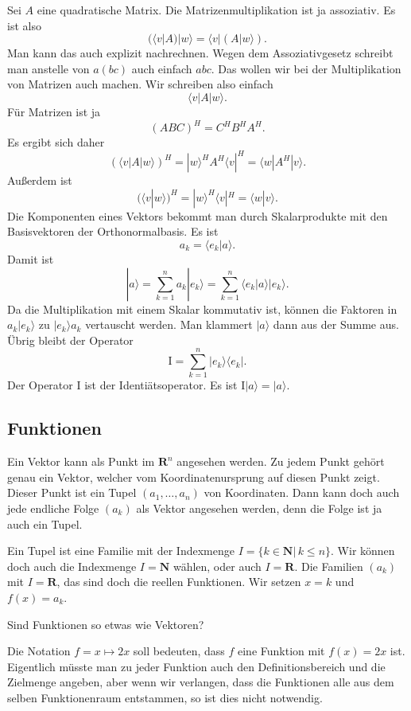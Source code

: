 \documentclass[a4paper,10pt,fleqn,twocolumn,twoside]{article}
\begin{document}
Sei \(A\) eine quadratische Matrix. Die Matrizenmultiplikation ist
ja assoziativ. Es ist also
\[(\langle v|A)|w\rangle = \langle v|(A|w\rangle).\]
Man kann das auch explizit nachrechnen. Wegen dem Assoziativgesetz
schreibt man anstelle von \(a(bc)\) auch einfach \(abc\). Das wollen
wir bei der Multiplikation von Matrizen auch machen. Wir schreiben also einfach
\[\langle v|A|w\rangle.\]
Für Matrizen ist ja
\[(ABC)^H = C^HB^HA^H.\]
Es ergibt sich daher
\[(\langle v|A|w\rangle)^H = |w\rangle^H A^H \langle v|^H
= \langle w|A^H|v\rangle.\]
Außerdem ist
\[(\langle v|w\rangle)^H = |w\rangle^H\langle v|^H
= \langle w|v\rangle.\]
Die Komponenten eines Vektors bekommt man durch Skalarprodukte mit
den Basisvektoren der Orthonormalbasis. Es ist
\[a_k = \langle e_k|a\rangle.\]
Damit ist
\[|a\rangle = \sum_{k=1}^n a_k |e_k\rangle
= \sum_{k=1}^n \langle e_k|a\rangle |e_k\rangle.\]
Da die Multiplikation mit einem Skalar kommutativ ist, können die
Faktoren in \(a_k|e_k\rangle\) zu \(|e_k\rangle a_k\) vertauscht
werden. Man klammert \(|a\rangle\) dann aus der Summe aus.
Übrig bleibt der Operator
\[\mathrm I = \sum_{k=1}^n |e_k\rangle\langle e_k|.\]
Der Operator \(\mathrm I\) ist der Identiätsoperator.
Es ist \(\mathrm I|a\rangle = |a\rangle\).


\subsection{Funktionen}

Ein Vektor kann als Punkt im \(\mathbf R^n\) angesehen werden.
Zu jedem Punkt gehört genau ein Vektor, welcher vom
Koordinatenursprung auf diesen Punkt zeigt. Dieser Punkt ist
ein Tupel \((a_1,\ldots,a_n)\) von Koordinaten. Dann kann doch auch
jede endliche Folge \((a_k)\) als Vektor angesehen werden, denn die
Folge ist ja auch ein Tupel.

Ein Tupel ist eine Familie mit der Indexmenge
\(I=\{k\in\mathbf N|\,k\leq n\}.\) Wir können doch auch die
Indexmenge \(I=\mathbf N\) wählen, oder auch \(I=\mathbf R\).
Die Familien \((a_k)\) mit \(I=\mathbf R\), das sind doch die
reellen Funktionen. Wir setzen \(x=k\) und \(f(x)=a_k\).

Sind Funktionen so etwas wie Vektoren?

Die Notation \(f=x\mapsto 2x\) soll bedeuten, dass \(f\) eine
Funktion mit \(f(x)=2x\) ist. Eigentlich müsste man zu jeder Funktion
auch den Definitionsbereich und die Zielmenge angeben, aber wenn
wir verlangen, dass die Funktionen alle aus dem selben Funktionenraum
entstammen, so ist dies nicht notwendig.
\end{document}
